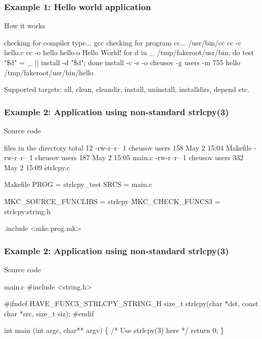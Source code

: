 \documentclass[hyperref={colorlinks=true}]{beamer}
\begin{document}
\begin{frame}[fragile]
  \frametitle{Example 1: Hello world application}

\begin{block}{How it works}
\begin{CodeNoLabel}
checking for compiler type... gcc
checking for program cc... /usr/bin/cc
cc     -c hello.c
cc   -o hello hello.o
Hello World!
for d in \_ /tmp/fakeroot/usr/bin; do  test "\$d" = \_ ||
   install -d "\$d";  done
install   -c -s  -o cheusov -g users -m 755
   hello /tmp/fakeroot/usr/bin/hello
\prompt{\$}
\end{CodeNoLabel}
\end{block}
Supported targets: all, clean, cleandir, install,
uninstall, installdirs, depend etc.
\end{frame}

\begin{frame}[fragile]
  \frametitle{Example 2: Application using non-standard strlcpy(3)}

\begin{block}{Source code}
  \begin{Code}{files in the directory}
total 12
-rw-r--r--  1 cheusov  users  158 May  2 15:04 Makefile
-rw-r--r--  1 cheusov  users  187 May  2 15:05 main.c
-rw-r--r--  1 cheusov  users  332 May  2 15:09 \h{strlcpy.c}
\prompt{\$}
  \end{Code}

  \begin{Code}{Makefile}
PROG =                 strlcpy_test
SRCS =                 main.c

\h{MKC\_SOURCE\_FUNCLIBS} =  strlcpy
\h{MKC\_CHECK\_FUNCS3} =     strlcpy:string.h

.include <mkc.prog.mk>
  \end{Code}
\end{block}

\end{frame}

\begin{frame}[fragile]
  \frametitle{Example 2: Application using non-standard strlcpy(3)}

\begin{block}{Source code}
\begin{Code}{main.c}
#include <string.h>

#ifndef \h{HAVE\_FUNC3\_STRLCPY\_STRING\_H}
size_t strlcpy(char *dst, const char *src, size_t siz);
#endif

int main (int argc, char** argv)
\{
    /*    Use strlcpy(3) here    */
    return 0;
\}
\end{Code}
\end{block}
\end{frame}
\end{document}
